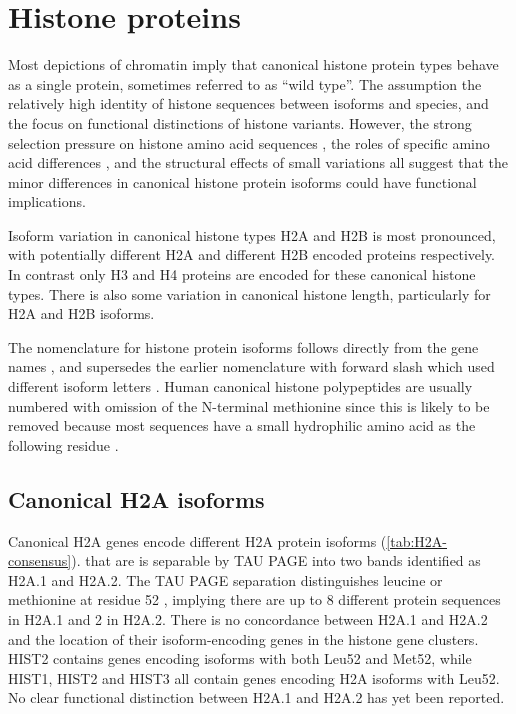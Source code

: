 \section{Histone proteins}
  Most depictions of chromatin imply that
  canonical histone protein types behave as a single protein,
  sometimes referred to as ``wild type''.
  The assumption the relatively high identity of histone sequences between isoforms and species,
  and the focus on functional distinctions of histone variants.
  However, the strong selection pressure on histone amino acid sequences \citep{birth-death-review},
  the roles of specific amino acid differences \citep{MazeAllis2014},
  and the structural effects of small variations \citep{KurumizakaCOSB2013}
  all suggest that the minor differences in canonical histone protein isoforms
  could have functional implications.

  Isoform variation in canonical histone types H2A and H2B is most pronounced,
  with potentially \HTwoAUniqueProteins{} different H2A
  and \HTwoBUniqueProteins{} different H2B encoded proteins respectively.
  In contrast only \HThreeUniqueProteins{} H3 and \HFourUniqueProteins{} H4 proteins
  are encoded for these canonical histone types.
  There is also some variation in canonical histone length, particularly for H2A and H2B isoforms.

  The nomenclature for histone protein isoforms follows directly from the gene names \citep{Marzluff02},
  and supersedes the earlier nomenclature with forward slash which used different isoform letters
  \citep{AlbigGenomics1997,AlbigHumangen1997}.
  Human canonical histone polypeptides are usually numbered
  with omission of the N-terminal methionine
  since this is likely to be removed because most sequences have
  a small hydrophilic amino acid as the following residue \citep{XiaoPeiBiochem2010}.

  \subsection{Canonical H2A isoforms}
    Canonical H2A genes encode \HTwoAUniqueProteins{} different H2A protein isoforms (\ref{tab:H2A-consensus}).
    that are is separable by TAU PAGE into two bands identified as H2A.1 and H2A.2.
    The TAU PAGE separation distinguishes leucine or methionine at residue 52 \citep{FranklinZweidler1977,Zweidler1977},
    implying there are up to 8 different protein sequences in H2A.1 and 2 in H2A.2.
    There is no concordance between H2A.1 and H2A.2
    and the location of their isoform-encoding genes in the histone gene clusters.
    HIST2 contains genes encoding isoforms with both Leu52 and Met52,
    while HIST1, HIST2 and HIST3 all contain genes encoding H2A isoforms with Leu52.
    No clear functional distinction between H2A.1 and H2A.2 has yet been reported.

